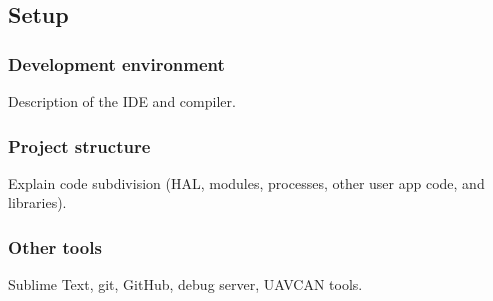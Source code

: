 \subsection{Setup}



\subsubsection{Development environment}
Description of the IDE and compiler.

\subsubsection{Project structure}
Explain code subdivision (HAL, modules, processes, other user app code, and libraries).

\subsubsection{Other tools}
Sublime Text, git, GitHub, debug server, UAVCAN tools.